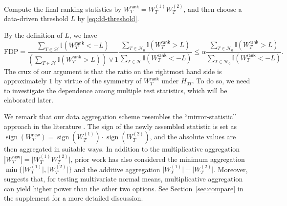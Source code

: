 \documentclass[12pt]{article}
\newcommand{\abs}[1]{\left\lvert#1\right\rvert}
\newcommand{\cH}{\mathcal{H}}
\newcommand{\cD}{\mathcal{D}}
\newcommand{\bbI}{\mathbb{I}}
\def\calP{{\mathcal P}}
\theoremstyle{plain}
\begin{document}
\begin{sloppypar}
\begin{algorithm}[ht!]
\begin{algorithmic}[1]
\STATE Compute the final ranking statistics by $W_T^{\mathsf{rank}}=W_{T}^{(1)}W_{T}^{(2)}$, and then choose a data-driven threshold $L$ by \eqref{eq:dd-threshold}.
	\end{algorithmic}
\end{algorithm}

 By the definition of $L$,  we have
$$
\text{FDP} = \frac{\sum_{T\in \cH  } \bbI(W_T^{\mathsf{rank}} <-L )}{\left( \sum_{T\in \cH  } \bbI(W_T^{\mathsf{rank}} >L ) \right) \vee 1 } \frac{\sum_{T\in \cH_0  } \bbI(W_T^{\mathsf{rank}} >L ) }{\sum_{T\in \cH  } \bbI(W_T^{\mathsf{rank}} <-L )  }  \le \alpha \frac{\sum_{T\in \cH_0  } \bbI(W_T^{\mathsf{rank}} >L ) }{ \sum_{T\in \cH_0  } \bbI(W_T^{\mathsf{rank}} <-L )}.
$$
The crux of our argument is that the ratio on the rightmost hand side is approximately $1$ by virtue of the symmetry of $W_T^{\mathsf{rank}}$ under $H_{0T}$. To do so, we need to investigate the dependence among multiple test statistics, which will be elaborated later. 

We remark that our data aggregation scheme resembles the ``mirror-statistic’’ approach in the literature \citep{xing2021controlling,dai2022false}. The sign of the newly assembled statistic is set as $\operatorname{sign}(W_T^{\mathsf{new}})=\operatorname{sign}(W_{T}^{(1)})\cdot \operatorname{sign}(W_{T}^{(2)})$, and the absolute values are then aggregated in suitable ways. In addition to the multiplicative aggregation $\abs{W_T^{\mathsf{new}}}=\big|W_{T}^{(1)}W_{T}^{(2)}\big|$, prior work \citep{xing2021controlling,dai2022false,dai2023scale} has also considered the minimum aggregation $\min\Big\{\big|W_{T}^{(1)}\big|,\big|W_{T}^{(2)}\big|\Big\}$ and the additive aggregation $\big|W_{T}^{(1)}\big|+\big|W_{T}^{(2)}\big|$. Moreover, \citep{dai2023scale,du2021false} suggests that, for testing multivariate normal means, multiplicative aggregation can yield higher power than the other two options. See Section~\ref{sec:compare} in the supplement for a more detailed discussion.


\end{sloppypar}
\end{document}
